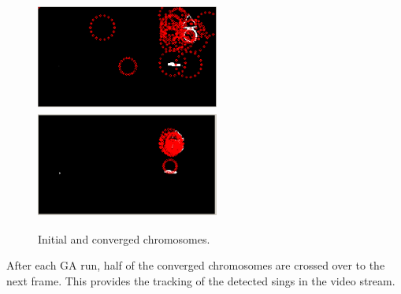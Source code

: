 \documentclass[twocolumn,letterpaper,10pt]{article}
\begin{document}
\begin{figure}[ht]
\begin{center}
\includegraphics[width=60mm,height=35mm]{img/sdfig3.eps}
\includegraphics[width=60mm,height=35mm]{img/sdfig4.eps}
\caption{Initial and converged chromosomes.}
\label{fig:sdfig4}
\end{center}
\end{figure}
\par
After each GA run, half of the converged chromosomes are crossed over to the next frame. This provides the tracking of the detected sings in the video stream.
\end{document}

